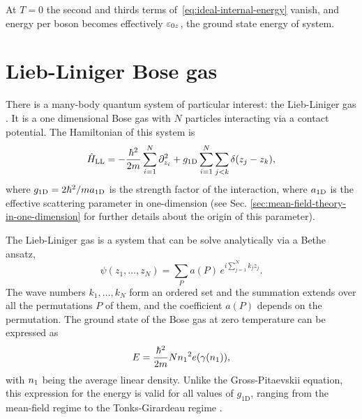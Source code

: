 At $T = 0$ the second and thirds terms of~\eqref{eq:ideal-internal-energy}
vanish, and energy per boson becomes effectively $\ez[0]$, the ground state
energy of system.








\section{Lieb-Liniger Bose gas}

There is a many-body quantum system of particular interest: the Lieb-Liniger gas
\cite{bib:lieb-phys-rev.130.1605.1963}. It is a one dimensional Bose gas with
$N$ particles interacting via a contact potential. The Hamiltonian of this
system is
%
\begin{equation}
	\label{eq:lieb-liniger-hamiltonian}
	\qmop{H}_{\mathrm{LL}} = -\frac{\hbar^2}{2m} \sum_{i=1}^{N} \partial^2_{z_i} + g_{1\mathrm{D}} \sum_{i=1}^{N} \sum_{j < k} \delta(z_j - z_k),
\end{equation}
%
where $g_{1\mathrm{D}} = 2\hbar^2 / m \asonedim$ is the strength factor of the
interaction,
where $\asonedim$ is the effective scattering parameter in one-dimension (see
Sec. \ref{sec:mean-field-theory-in-one-dimension} for further details about the
origin of this parameter).

The Lieb-Liniger gas is a system that can be solve analytically via a Bethe
ansatz,
%
\begin{equation}
	\psi(z_1, \ldots, z_N) = \sum_{P} a(P) \, e^{i \sum_{j=1}^{N} k_j z_j}.
\end{equation}
%
The wave numbers $k_1, \ldots, k_N$ form an ordered set and the summation
extends over all the permutations $P$ of them, and the coefficient $a(P)$
depends on the permutation. The ground state of the Bose gas at zero temperature
can be expressed as
%
\begin{equation}
	\label{eq:lieb-liniger-energy}
	E =\frac{\hbar^2}{2m} N \densityone^2 e(\gamma(\densityone)),
\end{equation}
%
with $\densityone$ being the average linear density. Unlike the Gross-Pitaevskii
equation, this expression for the energy is valid for all values of
$g_{\mathrm{1D}}$, ranging from the mean-field regime to the Tonks-Girardeau
regime \cite[]{bib:tonks-phys-rev.50.955.1936, bib:girardeau-j-math-phys.1960}.

